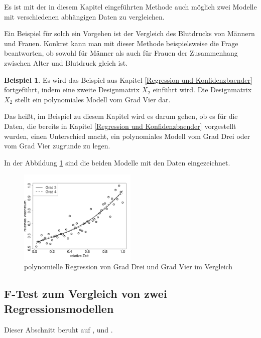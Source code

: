 \documentclass[12pt,a4paper]{article}
\theoremstyle{definition}
\newtheorem{Beispiel}[Definition]{Beispiel}
\theoremstyle{definition}
\theoremstyle{definition}
\theoremstyle{definition}
\newcommand{\betatwodat}[0]{\left[ \begin{array}{c} \beta_{0,2} \\ \beta_{1,2} \\ \beta_{1,3} \\ \beta_{1,4} \end{array} \right]}
\newcommand{\betaonedat}[0]{\left[ \begin{array}{c} \beta_{0,1} \\ \beta_{1,1} \end{array} \right]}
\begin{document}
Es ist mit der in diesem Kapitel eingeführten Methode auch möglich zwei Modelle mit verschiedenen abhängigen Daten zu vergleichen. 

Ein Beispiel für solch ein Vorgehen ist der Vergleich des Blutdrucks von Männern und Frauen. Konkret kann man mit dieser Methode beispielsweise die Frage beantworten, ob sowohl für Männer als auch für Frauen der Zusammenhang zwischen Alter und Blutdruck gleich ist.

\begin{Beispiel}
Es wird das Beispiel aus Kapitel \ref{Regression und Konfidenzbaender} fortgeführt, indem eine zweite Designmatrix $X_2$ einführt wird. Die Designmatrix $X_2$ stellt ein polynomiales Modell vom Grad Vier dar. 

Das heißt, im Beispiel zu diesem Kapitel wird es darum gehen, ob es für die Daten, die bereits in Kapitel \ref{Regression und Konfidenzbaender} vorgestellt wurden, einen Unterschied macht, ein polynomiales Modell vom Grad Drei oder vom Grad Vier zugrunde zu legen. 

In der Abbildung \ref{Vergleich-Bsp} sind die beiden Modelle mit den Daten eingezeichnet.

\begin{figure}[H] 
  \centering
     \includegraphics[width=0.5\textwidth]{Bsp-beide-in-einem-plot}
  \caption{polynomielle Regression von Grad Drei und Grad Vier im Vergleich}
  \label{Vergleich-Bsp}
\end{figure}

%
\end{Beispiel}




\subsection{F-Test zum Vergleich von zwei Regressionsmodellen}
\label{Vergleich F-Test}
Dieser Abschnitt beruht auf \cite[9-15]{Liu64} ,\cite[114-115]{Liu64} und \cite{Draper98}.
\end{document}
